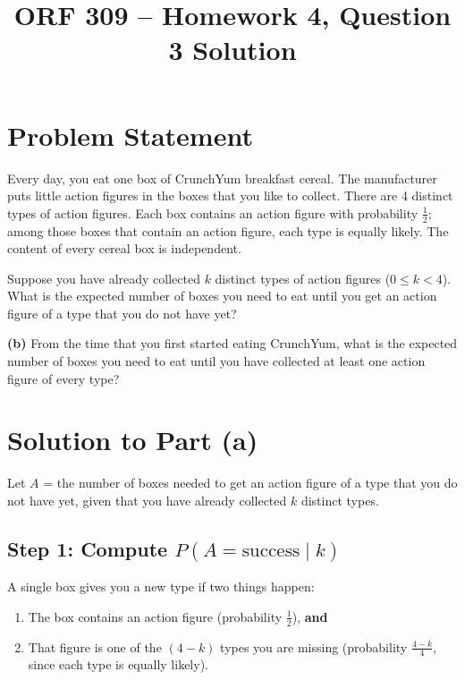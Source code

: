 \documentclass[11pt]{article}
\title{ORF 309 -- Homework 4, Question 3 Solution}
\author{}
\date{}
\begin{document}
\maketitle
\vspace{-2em}

\section*{Problem Statement}

Every day, you eat one box of CrunchYum\texttrademark{} breakfast cereal. The manufacturer puts little action figures in the boxes that you like to collect. There are 4 distinct types of action figures. Each box contains an action figure with probability $\tfrac{1}{2}$; among those boxes that contain an action figure, each type is equally likely. The content of every cereal box is independent.

Suppose you have already collected $k$ distinct types of action figures ($0 \le k < 4$). What is the expected number of boxes you need to eat until you get an action figure of a type that you do not have yet?

\textbf{(b)} From the time that you first started eating CrunchYum\texttrademark{}, what is the expected number of boxes you need to eat until you have collected at least one action figure of every type?

\section*{Solution to Part (a)}

Let $A$ = the number of boxes needed to get an action figure of a type that you do not have yet, given that you have already collected $k$ distinct types.

\subsection*{Step 1: Compute $P(A = \text{success} \mid k)$}

A single box gives you a new type if two things happen:
\begin{enumerate}
    \item The box contains an action figure (probability $\tfrac{1}{2}$), \textbf{and}
    \item That figure is one of the $(4 - k)$ types you are missing (probability $\tfrac{4-k}{4}$, since each type is equally likely).
\end{enumerate}
\end{document}
